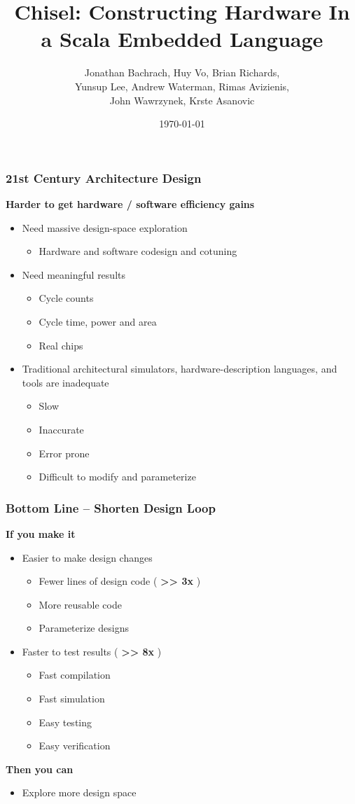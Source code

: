 \documentclass[xcolor=pdflatex,dvipsnames,table]{beamer}
\title{Chisel: Constructing Hardware In a Scala Embedded Language}
\author[Jonathan Bachrach et al]{Jonathan Bachrach, Huy Vo, Brian Richards, \\
Yunsup Lee, Andrew Waterman, Rimas Avizienis, \\
John Wawrzynek, Krste Asanovic}
\date{\today}
\institute[UC Berkeley]{EECS UC Berkeley}
\begin{document}
\begin{frame}
\titlepage
\end{frame}

\begin{frame}[fragile]
\frametitle{21st Century Architecture Design}
{\Large\textbf{Harder to get hardware / software efficiency gains}}
\vskip5mm
\begin{itemize}
\item Need massive design-space exploration
\begin{itemize}
\item Hardware and software codesign and cotuning
\end{itemize}
\item Need meaningful results
\begin{itemize}
\item Cycle counts
\item Cycle time, power and area
\item Real chips
\end{itemize}
\item Traditional architectural simulators, hardware-description
  languages, and tools are inadequate
\begin{itemize}
\item Slow
\item Inaccurate
\item Error prone
\item Difficult to modify and parameterize
\end{itemize}
\end{itemize}
\end{frame}

\begin{frame}[fragile]
\frametitle{Bottom Line -- Shorten Design Loop}
{\LARGE\textbf{If you make it}}
\vskip2mm
\begin{itemize}
\item Easier to make design changes
\begin{itemize}
\item Fewer lines of design code ( \textbf{>> 3x} )
\item More reusable code
\item Parameterize designs
\end{itemize}
\item Faster to test results ( \textbf{>> 8x} )
\begin{itemize}
\item Fast compilation
\item Fast simulation
\item Easy testing
\item Easy verification
\end{itemize}
\end{itemize}
\vskip0.8cm
{\LARGE\textbf{Then you can}}
\begin{itemize}
\item Explore more design space
\end{itemize}

\end{frame}
\end{document}
